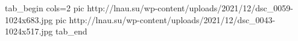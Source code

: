  
 
 
 
 

\ifcmt
  tab_begin cols=2
     pic http://lnau.su/wp-content/uploads/2021/12/dsc_0059-1024x683.jpg
     pic http://lnau.su/wp-content/uploads/2021/12/dsc_0043-1024x517.jpg
  tab_end
\fi
